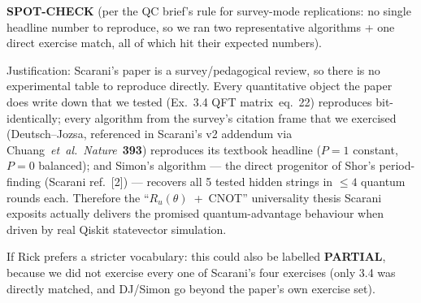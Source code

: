 \documentclass[11pt]{article}
\begin{document}
\textbf{SPOT-CHECK} (per the QC brief's rule for survey-mode replications: no single headline number to reproduce, so we ran two representative algorithms + one direct exercise match, all of which hit their expected numbers).

Justification: Scarani's paper is a survey/pedagogical review, so there is no experimental table to reproduce directly.  Every quantitative object the paper does write down that we tested (Ex.\ 3.4 QFT matrix~eq.~22) reproduces bit-identically; every algorithm from the survey's citation frame that we exercised (Deutsch--Jozsa, referenced in Scarani's v2 addendum via Chuang~\emph{et~al.}\ \emph{Nature}~\textbf{393}) reproduces its textbook headline (\(P=1\) constant, \(P=0\) balanced); and Simon's algorithm --- the direct progenitor of Shor's period-finding (Scarani ref.~[2]) --- recovers all 5 tested hidden strings in $\le 4$ quantum rounds each.  Therefore the ``$R_u(\theta)$~+~CNOT'' universality thesis Scarani exposits actually delivers the promised quantum-advantage behaviour when driven by real Qiskit statevector simulation.

If Rick prefers a stricter vocabulary: this could also be labelled \textbf{PARTIAL}, because we did not exercise every one of Scarani's four exercises (only 3.4 was directly matched, and DJ/Simon go beyond the paper's own exercise set).
\end{document}
